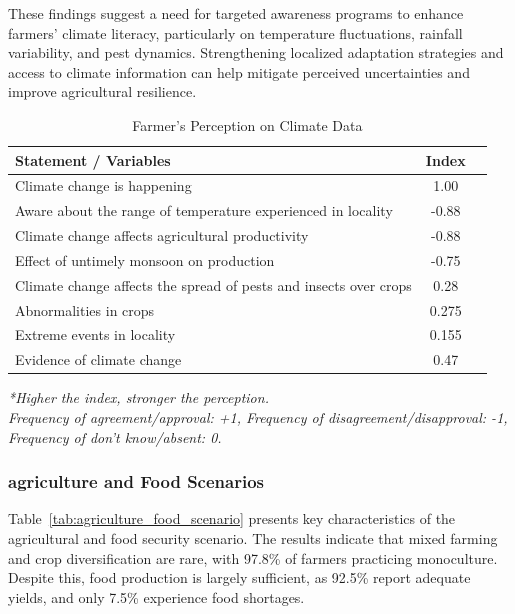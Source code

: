 These findings suggest a need for targeted awareness programs to enhance farmers’ climate literacy, particularly on temperature fluctuations, rainfall variability, and pest dynamics. Strengthening localized adaptation strategies and access to climate information can help mitigate perceived uncertainties and improve agricultural resilience.


\begin{table}[htbp]
    \centering
    \caption{Farmer’s Perception on Climate Data}
    \label{tab:farmers_perception}
    \begin{tabular}{@{}lcc@{}}
        \toprule
        \textbf{Statement / Variables} & \textbf{Index} \\
        \midrule
        Climate change is happening & 1.00 \\
        Aware about the range of temperature experienced in locality & -0.88 \\
        Climate change affects agricultural productivity & -0.88 \\
        Effect of untimely monsoon on production & -0.75 \\
        Climate change affects the spread of pests and insects over crops & 0.28 \\
        Abnormalities in crops & 0.275 \\
        Extreme events in locality & 0.155 \\
        Evidence of climate change & 0.47 \\
        \bottomrule
    \end{tabular}
    \vspace{0.5cm}

    \textit{*Higher the index, stronger the perception.} \\
    \textit{Frequency of agreement/approval: +1, Frequency of disagreement/disapproval: -1, Frequency of don't know/absent: 0.}
\end{table}

\subsubsection{agriculture and Food Scenarios}
Table~\ref{tab:agriculture_food_scenario} presents key characteristics of the agricultural and food security scenario. The results indicate that mixed farming and crop diversification are rare, with 97.8\% of farmers practicing monoculture. Despite this, food production is largely sufficient, as 92.5\% report adequate yields, and only 7.5\% experience food shortages.

